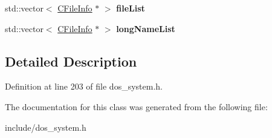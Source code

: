 \begin{DoxyCompactItemize}
\item 
\hypertarget{classDOS__Drive__Cache_1_1CFileInfo_a5470a346a90b401ea29fb40645aad237}{std\-::vector$<$ \hyperlink{classDOS__Drive__Cache_1_1CFileInfo}{C\-File\-Info} $\ast$ $>$ {\bfseries file\-List}}\label{classDOS__Drive__Cache_1_1CFileInfo_a5470a346a90b401ea29fb40645aad237}

\item 
\hypertarget{classDOS__Drive__Cache_1_1CFileInfo_a5cfea8ee640dc9b5f1808a52bc0781d9}{std\-::vector$<$ \hyperlink{classDOS__Drive__Cache_1_1CFileInfo}{C\-File\-Info} $\ast$ $>$ {\bfseries long\-Name\-List}}\label{classDOS__Drive__Cache_1_1CFileInfo_a5cfea8ee640dc9b5f1808a52bc0781d9}

\end{DoxyCompactItemize}


\subsection{Detailed Description}


Definition at line 203 of file dos\-\_\-system.\-h.



The documentation for this class was generated from the following file\-:\begin{DoxyCompactItemize}
\item 
include/dos\-\_\-system.\-h\end{DoxyCompactItemize}

